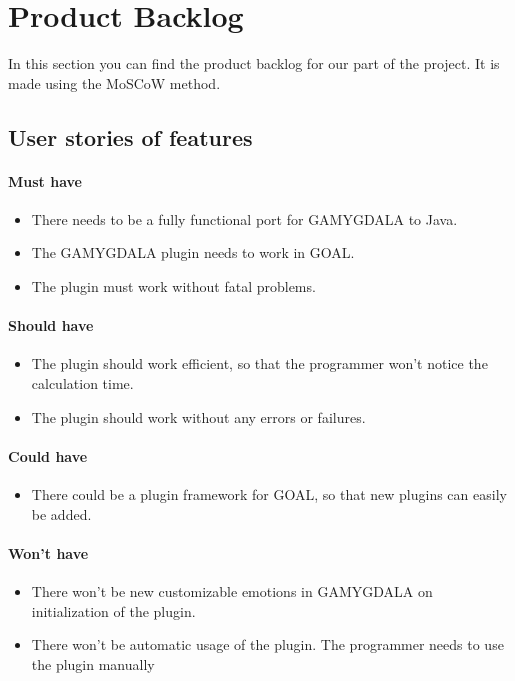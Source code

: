 \section{Product Backlog}
In this section you can find the product backlog for our part of the project. It is made using the MoSCoW method.

\subsection{User stories of features}
\paragraph{Must have} 
\begin{itemize}
\item There needs to be a fully functional port for GAMYGDALA to Java.
\item The GAMYGDALA plugin needs to work in GOAL.
\item The plugin must work without fatal problems.
\end{itemize}

\paragraph{Should have} 
\begin{itemize}
\item The plugin should work efficient, so that the programmer won't notice the calculation time.
\item The plugin should work without any errors or failures. 
\end{itemize}

\paragraph{Could have} 
\begin{itemize}
\item There could be a plugin framework for GOAL, so that new plugins can easily be added.
\end{itemize}

\paragraph{Won't have} 
\begin{itemize}
\item There won't be new customizable emotions in GAMYGDALA on initialization of the plugin.
\item There won't be automatic usage of the plugin. The programmer needs to use the plugin manually 
\end{itemize}

